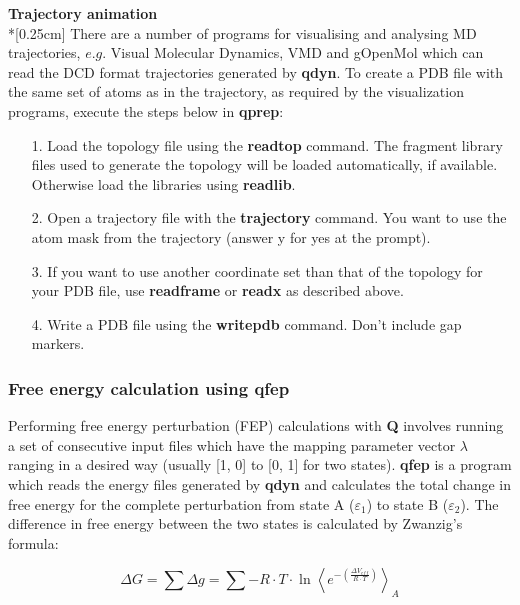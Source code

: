 \documentclass[a4paper,10pt]{article}
\begin{document}
\textbf{Trajectory animation}\\*[0.25cm] There are a number of
programs for visualising and analysing MD trajectories, $e.g.$
Visual Molecular Dynamics, VMD \cite{VMD, VMD_homepage} and
gOpenMol \cite{gOM, gOM_homepage} which can read the DCD format
trajectories generated by \textbf{qdyn}. To create a PDB file with the same
set of atoms as in the trajectory, as required by the
visualization programs,
execute the steps below in \textbf{qprep}:\\

\begin{itemize}
\item[1.] Load the topology file using the \textbf{readtop} command. The
fragment library files used to generate the topology will be
loaded automatically, if available. Otherwise load the libraries
using \textbf{readlib}.
\item[2.] Open a trajectory file with the \textbf{trajectory}
command. You want to use the atom mask from the trajectory (answer
y for yes at the prompt).
\item[3.] If you want to use another
coordinate set than that of the topology for your PDB file, use
\textbf{readframe} or \textbf{readx} as described above.
\item[4.] Write a PDB file using the \textbf{writepdb} command. Don't include gap
markers.
\end{itemize}


\subsubsection{Free energy calculation using \textbf{qfep}} Performing free
energy perturbation (FEP) calculations with \textbf{Q} involves running a
set of consecutive input files which have the mapping parameter
vector $\lambda$ ranging in a desired way (usually [1, 0] to [0,
1] for two states). \textbf{qfep} is a program which reads the energy files
generated by \textbf{qdyn} and calculates the total change in free energy
for the complete perturbation from state A ($\varepsilon_1$) to
state B ($\varepsilon_2$). The difference in free energy between
the two states is calculated by Zwanzig's formula:

\begin {equation}
\label{eq:zwanzig} \Delta G = \sum{ \Delta g} = \sum{ -R \cdot T
\cdot \ln \left \langle e^{- \left ( \frac{\Delta V_{eff}}{R \cdot
T}\right )} \right \rangle_A}
\end{equation}
\end{document}
